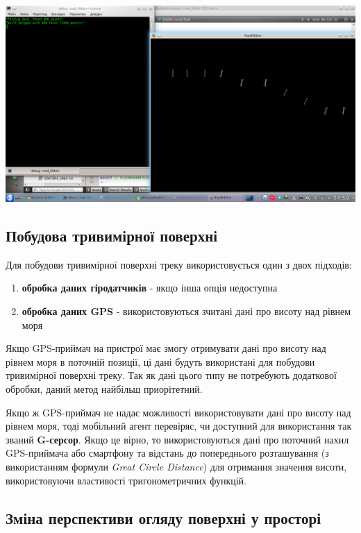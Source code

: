 \documentclass[simple,a4paper,14pt,ukrainian,utf8]{eskdtext}
\begin{document}
    \vspace{3em}
    
    \includegraphics[scale=0.34]{images/road2d_2.png}
    
    \subsection{Побудова тривимірної поверхні}
    
    Для побудови тривимірної поверхні треку використовується один з двох підходів:
    
    \begin{enumerate}
    	\item \textbf{обробка даних гіродатчиків} - якщо інша опція недоступна
    	\item \textbf{обробка даних GPS} - використовуються зчитані дані про висоту над рівнем моря
    \end{enumerate}
    
    Якщо GPS-приймач на пристрої має змогу отримувати дані про висоту над рівнем моря в поточній позиції, ці дані будуть використані для побудови тривимірної поверхні треку. Так як дані цього типу не потребують додаткової обробки, даний метод найбільш приорітетний.
    
    Якщо ж GPS-приймач не надає можливості використовувати дані про висоту над рівнем моря, тоді мобільний агент перевіряє, чи доступний для використання так званий \textbf{G-серсор}. Якщо це вірно, то використовуються дані про поточний нахил GPS-приймача або смартфону та відстань до попереднього розташування (з використанням формули \textit{Great Circle Distance}) для отримання значення висоти, використовуючи властивості тригонометричних функцій.
    
    \subsection{Зміна перспективи огляду поверхні у просторі}
    
\end{document}
